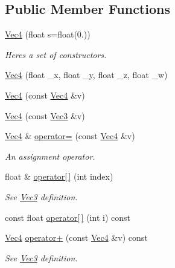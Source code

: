 \subsection*{Public Member Functions}
\begin{DoxyCompactItemize}
\item 
\hyperlink{struct_ori_engine_1_1_vec4_a28be40c1d1f863b5d62ca6283c49e388}{Vec4} (float s=float(0.))
\begin{DoxyCompactList}\small\item\em Here\textquotesingle{}s a set of constructors. \end{DoxyCompactList}\item 
\hyperlink{struct_ori_engine_1_1_vec4_af1620f14a897f7a9f94fbcd1e91fb9de}{Vec4} (float \+\_\+x, float \+\_\+y, float \+\_\+z, float \+\_\+w)
\item 
\hyperlink{struct_ori_engine_1_1_vec4_ae1591588e904abd9bd0772d81a50194f}{Vec4} (const \hyperlink{struct_ori_engine_1_1_vec4}{Vec4} \&v)
\item 
\hyperlink{struct_ori_engine_1_1_vec4_a703f1e094f1507602736d338bbe16f71}{Vec4} (const \hyperlink{struct_ori_engine_1_1_vec3}{Vec3} \&v)
\item 
\hyperlink{struct_ori_engine_1_1_vec4}{Vec4} \& \hyperlink{struct_ori_engine_1_1_vec4_a47afc3fac3c12536ef2fd980fb822ff6}{operator=} (const \hyperlink{struct_ori_engine_1_1_vec4}{Vec4} \&v)
\begin{DoxyCompactList}\small\item\em An assignment operator. \end{DoxyCompactList}\item 
float \& \hyperlink{struct_ori_engine_1_1_vec4_a8b078fddd99fc65f2a54a08948c56879}{operator\mbox{[}$\,$\mbox{]}} (int index)
\begin{DoxyCompactList}\small\item\em See \hyperlink{struct_ori_engine_1_1_vec3}{Vec3} definition. \end{DoxyCompactList}\item 
const float \hyperlink{struct_ori_engine_1_1_vec4_a5c5dea0b9eba3a118dbedf5ec57f3caf}{operator\mbox{[}$\,$\mbox{]}} (int i) const
\item 
\hyperlink{struct_ori_engine_1_1_vec4}{Vec4} \hyperlink{struct_ori_engine_1_1_vec4_a4d734f0ecb0ed6e41646ac9648dc0565}{operator+} (const \hyperlink{struct_ori_engine_1_1_vec4}{Vec4} \&v) const
\begin{DoxyCompactList}\small\item\em See \hyperlink{struct_ori_engine_1_1_vec3}{Vec3} definition. \end{DoxyCompactList}\item 

\end{DoxyCompactItemize}
